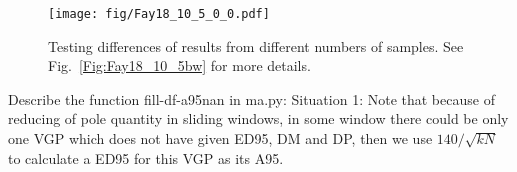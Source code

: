 \begin{figure}
    \centering
        \texttt{[image: fig/Fay18\_10\_5\_0\_0.pdf]}
    \captionsetup{width=.95\textwidth}
    \caption{Testing differences of results from different numbers of samples.
	See Fig.~\ref{Fig:Fay18_10_5bw} for more details.}\label{Fig:Fay18_10_5_0_0}
\end{figure}

Describe the function fill-df-a95nan in ma.py:
Situation 1: Note that because of reducing of pole quantity in sliding windows,
in some window there could be only one VGP which does not have given ED95, DM
and DP, then we use $140/\sqrt{kN}$~\cite{T91,T19} to calculate a ED95 for this
VGP as its A95.
